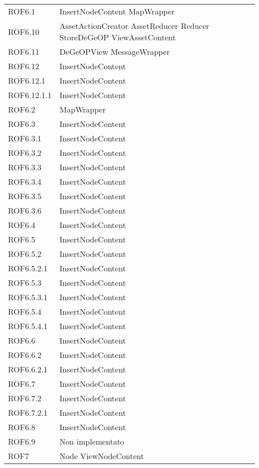 \begin{longtable}{p{2.5cm}!{\VRule[1pt]}p{5cm}}
	ROF6.1 & InsertNodeContent \newline MapWrapper\\
	ROF6.10 & AssetActionCreator \newline AssetReducer \newline Reducer \newline StoreDeGeOP \newline ViewAssetContent\\
	ROF6.11 & DeGeOPView \newline MessageWrapper\\
	ROF6.12 & InsertNodeContent\\
	ROF6.12.1 & InsertNodeContent\\
	ROF6.12.1.1 & InsertNodeContent\\
	ROF6.2 & MapWrapper\\
	ROF6.3 & InsertNodeContent\\
	ROF6.3.1 & InsertNodeContent\\
	ROF6.3.2 & InsertNodeContent\\
	ROF6.3.3 & InsertNodeContent\\
	ROF6.3.4 & InsertNodeContent\\
	ROF6.3.5 & InsertNodeContent\\
	ROF6.3.6 & InsertNodeContent\\
	ROF6.4 & InsertNodeContent\\
	ROF6.5 & InsertNodeContent\\
	ROF6.5.2 & InsertNodeContent\\
	ROF6.5.2.1 & InsertNodeContent\\
	ROF6.5.3 & InsertNodeContent\\
	ROF6.5.3.1 & InsertNodeContent\\
	ROF6.5.4 & InsertNodeContent\\
	ROF6.5.4.1 & InsertNodeContent\\
	ROF6.6 & InsertNodeContent\\
	ROF6.6.2 & InsertNodeContent\\
	ROF6.6.2.1 & InsertNodeContent\\
	ROF6.7 & InsertNodeContent\\
	ROF6.7.2 & InsertNodeContent\\
	ROF6.7.2.1 & InsertNodeContent\\
	ROF6.8 & InsertNodeContent\\
	ROF6.9 & Non implementato\\
	ROF7 & Node \newline ViewNodeContent\\

\end{longtable}
